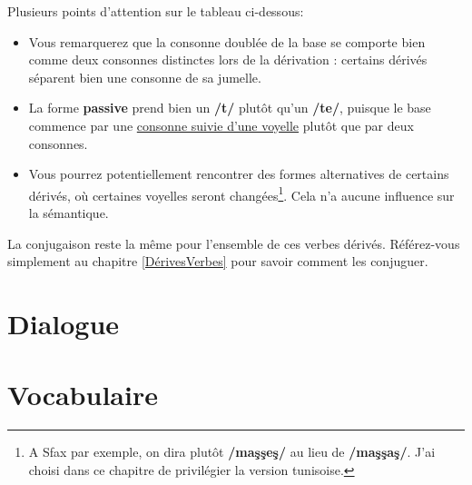 Plusieurs points d'attention sur le tableau ci-dessous: 
\begin{itemize}
    \item Vous remarquerez que la consonne doublée de la base se comporte bien comme deux consonnes distinctes lors de la dérivation : certains dérivés séparent bien une consonne de sa jumelle.
    \item La forme \textbf{passive} prend bien un \textbf{/t/} plutôt qu'un \textbf{/te/}, puisque le base commence par une \underline{consonne suivie d'une voyelle} plutôt que par deux consonnes.
    \item Vous pourrez potentiellement rencontrer des formes alternatives de certains dérivés, où certaines voyelles seront changées\footnote{A Sfax par exemple, on dira plutôt \textbf{/ma\c{s}\c{s}e\c{s}/} au lieu de \textbf{/ma\c{s}\c{s}a\c{s}/}. J'ai choisi dans ce chapitre de privilégier la version tunisoise.}. Cela n'a aucune influence sur la sémantique.
\end{itemize}

La conjugaison reste la même pour l'ensemble de ces verbes dérivés. Référez-vous simplement au chapitre \ref{DérivesVerbes} pour savoir comment les conjuguer.


\section*{Dialogue}
\section*{Vocabulaire}